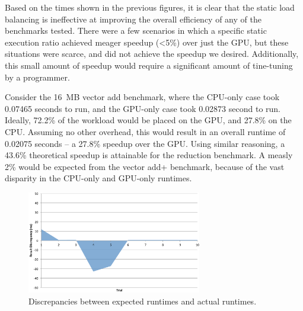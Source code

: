 \documentclass[journal]{IEEEtran}
\begin{document}




Based on the times shown in the previous figures, it is clear that the
static load balancing is ineffective at improving the overall efficiency
of any of the benchmarks tested.  There were a few scenarios in which
a specific static execution ratio achieved meager speedup (<5\%) over
just the GPU, but these situations were scarce, and did not achieve the
speedup we desired.  Additionally, this small amount of speedup would
require a significant amount of tine-tuning by a programmer.

Consider the 16~MB vector add benchmark, where the CPU-only case took
0.07465 seconds to run, and the GPU-only case took 0.02873 second to run.
Ideally, 72.2\% of the workload would be placed on the GPU, and 27.8\%
on the CPU.  Assuming no other overhead, this would result in an overall
runtime of 0.02075 seconds -- a 27.8\% speedup over the GPU.  Using similar
reasoning, a 43.6\% theoretical speedup is attainable for the reduction
benchmark.  A measly 2\% would be expected from the vector add+ benchmark,
because of the vast disparity in the CPU-only and GPU-only runtimes.

\begin{figure}[t]
\centering
\includegraphics[width=3.0in]{sequential_discrepancy}
\caption{Discrepancies between expected runtimes and actual runtimes.}
\label{fig:sequential_discrepancy}
\end{figure}
\end{document}
